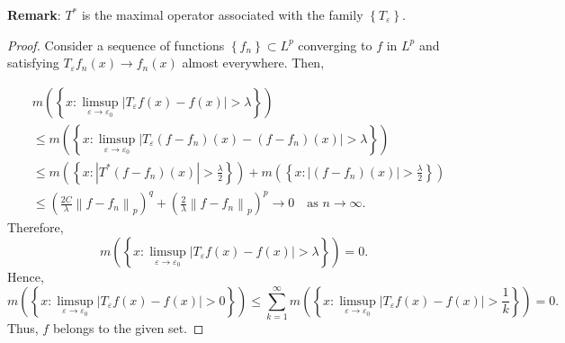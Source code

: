 \documentclass[12pt,openany]{book}
\theoremstyle{definition}
\begin{document}
\noindent\textbf{Remark}: $T^*$ is the maximal operator associated with the family $\left\{T_{\varepsilon}\right\}$.
\begin{proof}
    Consider a sequence of functions $\left\{f_n\right\} \subset L^p$ converging to $f$ in $L^p$ and satisfying $T_{\varepsilon} f_n(x) \rightarrow f_n(x)$ almost everywhere. Then,

$$\begin{aligned}
& m\left(\left\{x: \limsup _{\varepsilon \rightarrow \varepsilon_0}\left|T_{\varepsilon} f(x)-f(x)\right|>\lambda\right\}\right) \\
& \leqslant m\left(\left\{x:\limsup _{\varepsilon \rightarrow \varepsilon_0}\left|T_{\varepsilon}\left(f-f_n\right)(x)-\left(f-f_n\right)(x)\right|>\lambda\right\}\right) \\
& \leqslant m\left(\left\{x:\left|T^*\left(f-f_n\right)(x)\right|>\frac{\lambda}{2}\right\}\right) + m\left(\left\{x:\left|\left(f-f_n\right)(x)\right|>\frac{\lambda}{2}\right\}\right) \\
& \leqslant \left(\frac{2 C}{\lambda}\left\|f-f_n\right\|_p\right)^q + \left(\frac{2}{\lambda}\left\|f-f_n\right\|_p\right)^p \rightarrow 0 \quad \text{as } n \rightarrow \infty.
\end{aligned}$$
Therefore,
$$m\left(\left\{x: \limsup _{\varepsilon \rightarrow \varepsilon_0}\left|T_{\varepsilon} f(x)-f(x)\right|>\lambda\right\}\right) = 0.$$
Hence,
$$m\left(\left\{x: \limsup _{\varepsilon \rightarrow \varepsilon_0}\left|T_{\varepsilon} f(x)-f(x)\right|>0\right\}\right) \leqslant \sum_{k=1}^{\infty} m\left(\left\{x: \limsup _{\varepsilon \rightarrow \varepsilon_0}\left|T_{\varepsilon} f(x)-f(x)\right|>\frac{1}{k}\right\}\right) = 0.$$
Thus, $f$ belongs to the given set.
\end{proof}
\end{document}
